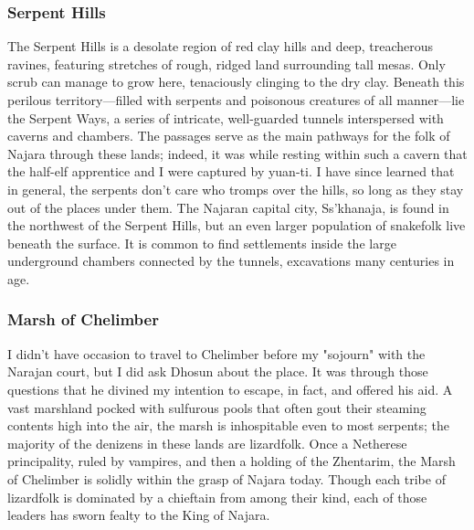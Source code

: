 \documentclass[10pt,a4paper,twoside,twocolumn,openany,bg=print,nodeprecatedcode]{dndbook}
\begin{document}
\subsubsection{Serpent Hills}
The Serpent Hills is a desolate region of red clay hills and deep, treacherous ravines, featuring stretches of rough, ridged land surrounding tall mesas. Only scrub can manage to grow here, tenaciously clinging to the dry clay. Beneath this perilous territory—filled with serpents and poisonous creatures of all manner—lie the Serpent Ways, a series of intricate, well-guarded tunnels interspersed with caverns and chambers. The passages serve as the main pathways for the folk of Najara through these lands; indeed, it was while resting within such a cavern that the half-elf apprentice and I were captured by yuan-ti. I have since learned that in general, the serpents don't care who tromps over the hills, so long as they stay out of the places under them. The Najaran capital city, Ss'khanaja, is found in the northwest of the Serpent Hills, but an even larger population of snakefolk live beneath the surface. It is common to find settlements inside the large underground chambers connected by the tunnels, excavations many centuries in age.
\subsubsection{Marsh of Chelimber}
I didn't have occasion to travel to Chelimber before my "sojourn" with the Narajan court, but I did ask Dhosun about the place. It was through those questions that he divined my intention to escape, in fact, and offered his aid. A vast marshland pocked with sulfurous pools that often gout their steaming contents high into the air, the marsh is inhospitable even to most serpents; the majority of the denizens in these lands are lizardfolk. Once a Netherese principality, ruled by vampires, and then a holding of the Zhentarim, the Marsh of Chelimber is solidly within the grasp of Najara today. Though each tribe of lizardfolk is dominated by a chieftain from among their kind, each of those leaders has sworn fealty to the King of Najara.
\end{document}
